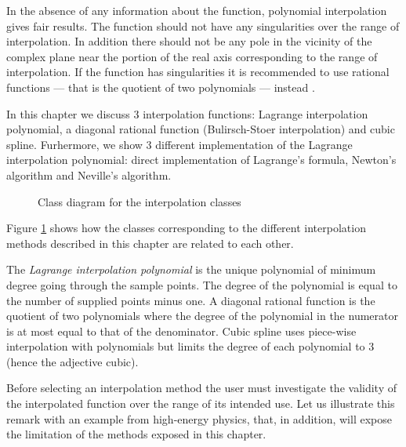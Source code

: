 \documentclass[twoside]{book}
\begin{document}
In the absence of any information about the function, polynomial
interpolation gives fair results. The function should not have any
singularities over the range of interpolation. In addition there
should not be any pole in the vicinity of the complex plane near
the portion of the real axis corresponding to the range of
interpolation. If the function has singularities it is recommended
to use rational functions --- that is the quotient of two
polynomials --- instead \cite{Press}.

In this chapter we discuss 3 interpolation functions: Lagrange
interpolation polynomial, a diagonal rational function
(Bulirsch-Stoer interpolation) and cubic spline. Furhermore, we
show 3 different implementation of the Lagrange interpolation
polynomial: direct implementation of Lagrange's formula, Newton's
algorithm and Neville's algorithm.
\begin{figure}
\label{cls:interpolation}
\center{}
\caption{Class diagram for the interpolation classes}
\end{figure}
Figure \ref{cls:interpolation} shows how the classes corresponding
to the different interpolation methods described in this chapter
are related to each other.

 The {\it Lagrange interpolation polynomial}
is the unique polynomial of minimum degree going through the
sample points. The degree of the polynomial is equal to the number
of supplied points minus one. A diagonal rational function is the
quotient of two polynomials where the degree of the polynomial in
the numerator is at most equal to that of the denominator. Cubic
spline uses piece-wise interpolation with polynomials but limits
the degree of each polynomial to 3 (hence the adjective cubic).

 Before selecting an interpolation method the
user must investigate the validity of the interpolated function
over the range of its intended use. Let us illustrate this remark
with an example from high-energy physics, that, in addition, will
expose the limitation of the methods exposed in this chapter.
\end{document}
